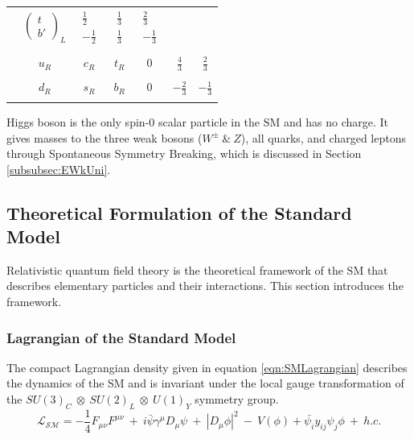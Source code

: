 \begin{table}
\begin{center}
\begin{tabular}{| c | c | c | c | c | c | c |}
                     &$\begin{pmatrix}  t \\ b{'} \end{pmatrix}_{L}$  
                    &$\begin{matrix} \frac{1}{2} \\[0.15cm] -\frac{1}{2} \end{matrix}$
                    &$\begin{matrix} \frac{1}{3} \\[0.15cm] \frac{1}{3} \end{matrix}$
                    &$\begin{matrix} \frac{2}{3} \\[0.15cm] -\frac{1}{3} \end{matrix}$\\
                & & & & & & \\
                    & $u_{R}$ & $c_{R}$ &  $t_{R}$ & $0$ & $\frac{4}{3}$  & $\frac{2}{3}$ \\
                    & & & & & & \\
                    & $d_{R}$ & $s_{R}$ &  $b_{R}$ & $0$ & $-\frac{2}{3}$  & $-\frac{1}{3}$ \\
& & & & & & \\
\hline
\end{tabular}
\label{tab:Fermions}
\end{center}
\end{table}

Higgs boson is the only spin-0 scalar particle in the SM and has no charge. It gives masses to the three weak bosons ($W^{\pm} ~\&~ Z$), all quarks, and charged leptons through Spontaneous Symmetry Breaking, which is discussed in Section \ref{subsubsec:EWkUni}.

\subsection{Theoretical Formulation of the Standard Model}
\label{subsec:TheoryFormulation}

Relativistic quantum field theory is the theoretical framework of the SM that describes elementary particles and their interactions. This section introduces the framework. 

\subsubsection{Lagrangian of the Standard Model}
\label{subsubsec:SMLag}
The compact Lagrangian density given in equation \ref{eqn:SMLagrangian} describes the dynamics of the SM and is invariant under the local gauge transformation of the $SU(3)_{C}~\otimes~SU(2)_{L}~\otimes~U(1)_{Y}$ symmetry group. 
\begin{equation}
\mathcal{L_{SM}} = -\frac{1}{4}F_{\mu\nu}F^{\mu\nu} ~+~ i\bar{\psi}\gamma^{\mu}D_{\mu}\psi ~+~ |D_{\mu}\phi|^{2} ~-~V(\phi) + \bar{\psi_{i}}y_{ij}\psi_{j}\phi ~+~ h.c.
\label{eqn:SMLagrangian}
\end{equation}

